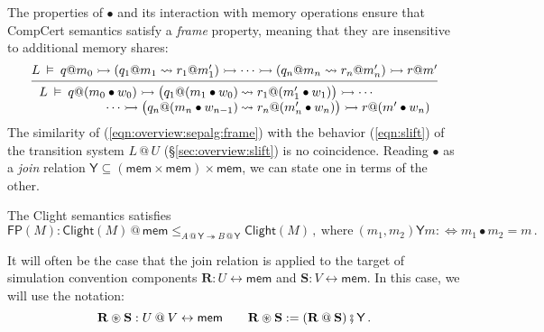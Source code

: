 \documentclass[acmsmall,screen,review,anonymous,nonacm]{acmart}
\newcommand{\kw}[1]{\ensuremath{ \mathsf{#1} }}
\newcommand{\jr}{\mathsf{Y}}
\newcommand{\vcomp}{\fatsemi}
\newcommand{\sepconj}{\oast}
\begin{document}
The properties of $\bullet$
and its interaction with memory operations
ensure that CompCert semantics satisfy
a \emph{frame} property,
meaning that they are insensitive to
additional memory shares:
\begin{equation} \label{eqn:overview:sepalg:frame}
  \begin{prooftree}
  \hypo{
  L \:\vDash\: q@m_0 \rightarrowtail
    (q_1@m_1 \leadsto r_1@m_1') \rightarrowtail
    \cdots \rightarrowtail
    (q_n@m_n \leadsto r_n@m_n') \rightarrowtail
    r@m'}
  \infer1{
   {\begin{array}{r@{\:}l}
    L \:\vDash\: q@(m_0 \bullet w_0) \rightarrowtail
      \big( q_1@(m_1 \bullet w_0) &\leadsto r_1@(m_1' \bullet w_1) \big) \rightarrowtail
      \cdots \\ \cdots \rightarrowtail
      \big( q_n@(m_n \bullet w_{n-1}) &\leadsto r_n@(m_n' \bullet w_n) \big) \rightarrowtail
      r@(m' \bullet w_n)
   \end{array}} }
  \end{prooftree}
\end{equation}
The similarity of (\ref{eqn:overview:sepalg:frame})
with the behavior (\ref{eqn:slift})
of the transition system $L \mathbin@ U$ (\S\ref{sec:overview:slift})
is no coincidence.
Reading $\bullet$ as a \emph{join} relation
$\jr \subseteq (\kw{mem} \times \kw{mem}) \times \kw{mem}$,
we can state one in terms of the other.

\begin{theorem} \label{thm:clightframe}
The Clight semantics satisfies
\[
  \kw{FP}(M) :
  \kw{Clight}(M) \mathbin@ \kw{mem}
  \le_{A \mathbin@ \jr \twoheadrightarrow B \mathbin@ \jr}
  \kw{Clight}(M)
  \,,
  \: \text{where} \:
  (m_1, m_2) \mathrel{\jr} m  :\Leftrightarrow
  m_1 \bullet m_2 = m
  \,.
\]
\end{theorem}

It will often be the case that the join relation
is applied to the target of
simulation convention components
$\mathbf{R} : U \leftrightarrow \kw{mem}$ and
$\mathbf{S} : V \leftrightarrow \kw{mem}$.
In this case,
we will use the notation:
\[
  \mathbf{R} \sepconj \mathbf{S} : U \mathbin@ V \leftrightarrow \kw{mem}
  \qquad
  \mathbf{R} \sepconj \mathbf{S} :=
  (\mathbf{R} \mathbin@ \mathbf{S}) \vcomp \jr
  \,.
\]
\end{document}
